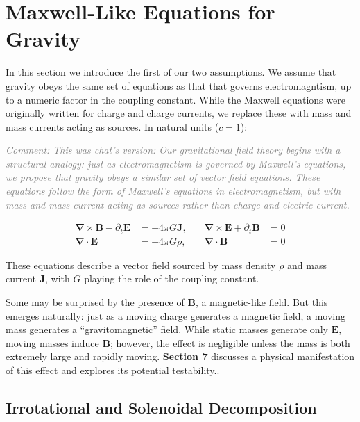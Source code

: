 \documentclass {article}
\renewcommand\vec{\mathbf}
\let\OldS\nabla
\renewcommand{\nabla}{\boldsymbol{\OldS}}
\newcommand{\comment}[1]{\textcolor{gray}{\small\textit{Comment: #1}}}
\begin{document}
\section{Maxwell-Like Equations for Gravity}

In this section we introduce the first of our two assumptions. We assume that gravity obeys the same set of  equations as that that governs electromagntism, up to a numeric factor in the coupling constant. While the Maxwell equations were originally written for charge and charge currents, we replace these with mass and  mass currents acting as sources.  In natural units (\( c = 1 \)):

\comment{This was chat's version: Our gravitational field theory begins with a structural analogy: just as electromagnetism is governed by Maxwell's equations, we propose that gravity obeys a similar set of vector field equations.  These equations follow the form of Maxwell's equations in electromagnetism, but with mass and mass current acting as sources rather than charge and electric current.}

\begin{equation}
\begin{aligned}
\nabla \times \vec{B} - \partial_t \vec{E} &= -4 \pi G \vec{J}, \quad 
&\nabla \times \vec{E} + \partial_t \vec{B} &= 0 \\
\nabla \cdot \vec{E} &= -4 \pi G \rho, \quad 
&\nabla \cdot \vec{B} &= 0
\end{aligned}
\end{equation}


These equations describe a vector field sourced by mass density \( \rho \) and mass current \( \vec{J} \), with \( G \) playing the role of the coupling constant. 

Some may be surprised by the presence of \( \vec{B} \), a magnetic-like field. But this emerges naturally: just as a moving charge generates a magnetic field, a moving mass generates a “gravitomagnetic” field. While static masses generate only \( \vec{E}\), moving masses induce \( \vec{B} \); however, the effect is negligible unless the mass is both extremely large and rapidly moving. \textbf{Section 7} discusses a physical manifestation of this effect and explores its potential testability..

\subsection{Irrotational and Solenoidal Decomposition}
\end{document}

